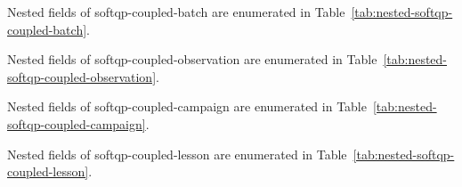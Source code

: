 Nested fields of softqp-coupled-batch are enumerated in Table~\ref{tab:nested-softqp-coupled-batch}.



Nested fields of softqp-coupled-observation are enumerated in Table~\ref{tab:nested-softqp-coupled-observation}.



Nested fields of softqp-coupled-campaign are enumerated in Table~\ref{tab:nested-softqp-coupled-campaign}. %


Nested fields of softqp-coupled-lesson are enumerated in Table~\ref{tab:nested-softqp-coupled-lesson}.



